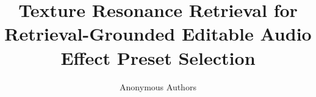 \documentclass[journal,10pt]{IEEEtran}
\title{Texture Resonance Retrieval for Retrieval-Grounded Editable Audio Effect Preset Selection}
\author{Anonymous Authors}
\begin{document}
\newcommand{\paperbibliostyle}{IEEEtranN}

\end{document}
